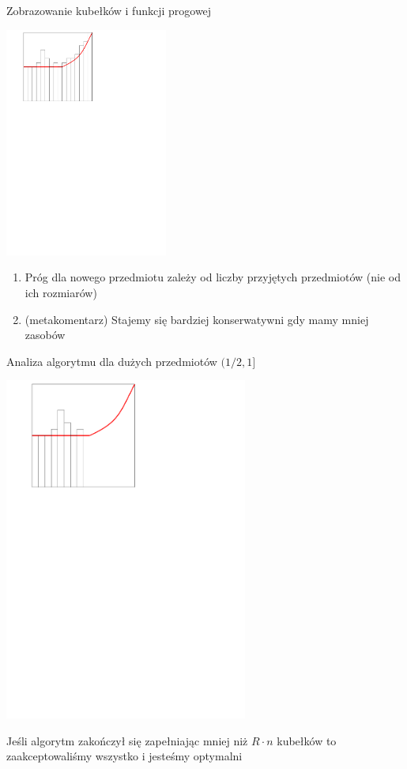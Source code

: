 \documentclass{beamer}
\begin{document}
\begin{frame}{Zobrazowanie kubełków i funkcji progowej}
  \begin{center}\includegraphics[width=0.4\textwidth]{figs/example1.pdf}\end{center}
  
  \begin{enumerate}
    \item Próg dla nowego przedmiotu zależy od liczby przyjętych przedmiotów (nie od ich rozmiarów)
    \item (metakomentarz) Stajemy się bardziej konserwatywni gdy mamy mniej zasobów
  \end{enumerate}
\end{frame}

\begin{frame}{Analiza algorytmu dla dużych przedmiotów $(1/2, 1]$}
  \begin{center}
    \includegraphics[width=0.6\textwidth]{figs/analysis_leqR.pdf}
  \end{center}

  \vspace{-0.1cm}
  
  Jeśli algorytm zakończył się zapełniając mniej niż $R\cdot n$ kubełków to zaakceptowaliśmy wszystko i jesteśmy optymalni
  \end{frame}
\end{document}
